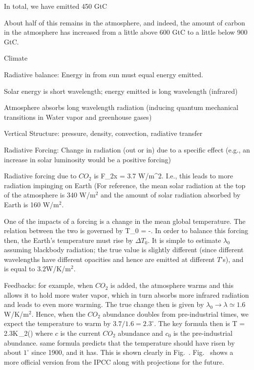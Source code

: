 \documentclass[11pt]{book}
\begin{document}
\item In total, we have emitted 450 GtC
\item About half of this remains in the atmosphere, and indeed, the amount of carbon in the atmosphere has increased from a little above 600 GtC to a little below 900 GtC.
\eee
\item Climate
\bee
\item Radiative balance: Energy in from sun must equal energy emitted. 
\bei
\item Solar energy is short wavelength; energy emitted is long wavelength (infrared)
\item Atmosphere absorbs long wavelength radiation (inducing quantum mechanical transitions in Water vapor and greenhouse gases)
\item Vertical Structure: pressure, density, convection, radiative transfer
\item Radiative Forcing: Change in radiation (out or in) due to a specific effect (e.g., an increase in solar luminosity would be a positive forcing)
\item Radiative forcing due to $CO_2$ is
\be
F_{2x} = 3.7 W/m^2.\ee
I.e., this leads to more radiation impinging on Earth (For reference, the mean solar radiation at the top of the atmosphere is 340 W/m$^2$ and the amount of solar radiation absorbed by Earth is 160 W/m$^2$.
\item One of the impacts of a forcing is a change in the mean global temperature. The relation between the two is governed by
\be
\Delta T_0 = -.\ee 
In order to balance this forcing then, the Earth's temperature must rise by $\Delta T_0$. It is simple to estimate $\lambda_0$ assuming blackbody radiation; the true value is slightly different (since different wavelengths have different opacities and hence are emitted at different $T$'s), and is equal to $3.2$W/K/m$^2$. 
\item Feedbacks: for example, when $CO_2$ is added, the atmosphere warms and this allows it to hold more water vapor, which in turn absorbs more infrared radiation and leads to even more warming. The true change then is given by $\lambda_0\rightarrow\lambda \simeq 1.6$W/K/m$^2$. Hence, when the $CO_2$ abundance doubles from pre-industrial times, we expect the temperature to warm by $3.7/1.6=2.3^\circ$. The key formula then is
\be
\Delta T = 2.3K\,\log_2\left(\right)\ee
where $c$ is the current $CO_2$ abundance and $c_0$ is the pre-industrial abundance.
same formula predicts that the temperature should have risen by about $1^\circ$ since 1900, and it has. This is shown clearly in Fig.~. 
Fig.~ shows a more official version from the IPCC along with projections for the future.
\eei 
\eee
\eei
\end{document}
